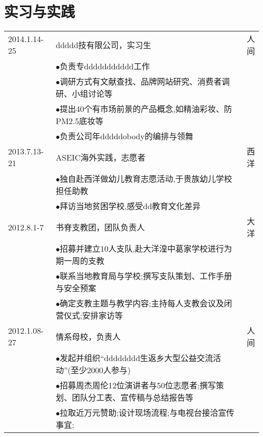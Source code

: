 \documentclass[a4paper]{article} %
\begin{document}

\section{实习与实践}

\begin{tabular}{llr}
\rowcolor{mypink}
	2014.1.14-25&  ddddd技有限公司，实习生& 人间\\
& $\bullet$负责专ddddddddddd工作&\\
& $\bullet$调研方式有文献查找、品牌网站研究、消费者调研、小组讨论等&\\
& $\bullet$提出40个有市场前景的产品概念,如精油彩妆、防PM2.5底妆等&\\
& $\bullet$负责公司年dddddobody的编排与领舞&\\


	\rowcolor{mypink}
2013.7.13-21&ASEIC海外实践，志愿者&西洋\\
& $\bullet$独自赴西洋做幼儿教育志愿活动,于贵族幼儿学校担任助教&\\
& $\bullet$拜访当地贫困学校,感受dd教育文化差异&\\


	\rowcolor{mypink}
2012.8.1-7&书脊支教团，团队负责人&大洋\\
 & $\bullet$招募并建立10人支队,赴大洋湟中葛家学校进行为期一周的支教&\\
 & $\bullet$联系当地教育局与学校;撰写支队策划、工作手册与安全预案&\\
 & $\bullet$确定支教主题与教学内容;主持每人支教会议及闭营仪式;安排家访等&\\



	\rowcolor{mypink}
2012.1.08-27&情系母校，负责人&人间\\
 & $\bullet$发起并组织“dddddddd生返乡大型公益交流活动”(至少2000人参与)&\\
 & $\bullet$招募周杰周伦12位演讲者与50位志愿者;撰写策划、团队分工表、宣传稿与总结报告等&\\
 & $\bullet$拉取近万元赞助;设计现场流程;与电视台接洽宣传事宜;&\\


\end{tabular}

\end{document}
